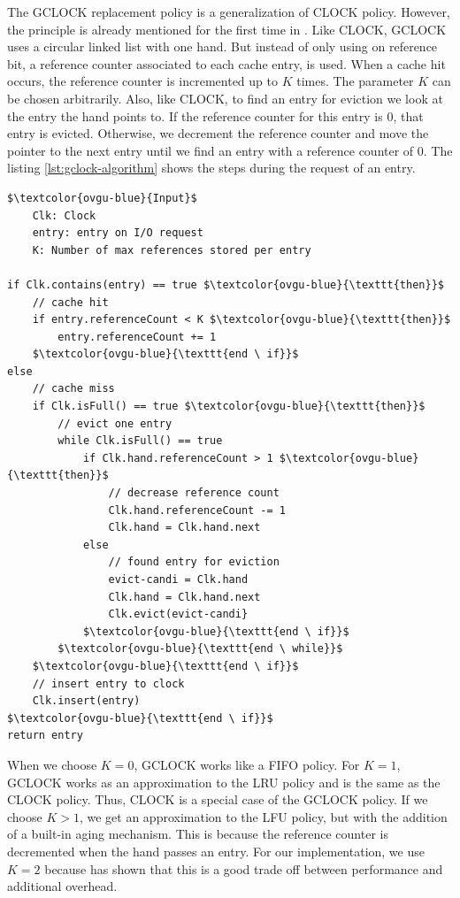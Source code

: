 \documentclass[
	12pt,
	a4paper,
	abstract,
	bibliography=totoc,
	chapterprefix,
	headings=openright,
	numbers=endperiod,
	parskip=half,
	twoside,
]{scrreprt}
\begin{document}
The GCLOCK replacement policy \cite{smith1978sequentiality} is a generalization of CLOCK policy.
However, the principle is already mentioned for the first time in \cite{corbato1968paging}.
Like CLOCK, GCLOCK uses a circular linked list with one hand.
But instead of only using on reference bit, a reference counter associated to each cache entry, is used.
When a cache hit occurs, the reference counter is incremented up to $K$ times.
The parameter $K$ can be chosen arbitrarily.
Also, like CLOCK, to find an entry for eviction we look at the entry the hand points to.
If the reference counter for this entry is 0, that entry is evicted.
Otherwise, we decrement the reference counter and move the pointer to the next entry 
until we find an entry with a reference counter of 0.
The listing \ref{lst:gclock-algorithm} shows the steps during the request of an entry.

\bigskip

\begin{lstlisting}[mathescape=true,caption=GCLOCK replacement algorithm in pseudocode,label=lst:gclock-algorithm]
$\textcolor{ovgu-blue}{Input}$
	Clk: Clock
	entry: entry on I/O request
	K: Number of max references stored per entry

if Clk.contains(entry) == true $\textcolor{ovgu-blue}{\texttt{then}}$
	// cache hit
	if entry.referenceCount < K $\textcolor{ovgu-blue}{\texttt{then}}$
		entry.referenceCount += 1
	$\textcolor{ovgu-blue}{\texttt{end \ if}}$
else
	// cache miss
	if Clk.isFull() == true $\textcolor{ovgu-blue}{\texttt{then}}$
		// evict one entry
		while Clk.isFull() == true
			if Clk.hand.referenceCount > 1 $\textcolor{ovgu-blue}{\texttt{then}}$
				// decrease reference count 
				Clk.hand.referenceCount -= 1
				Clk.hand = Clk.hand.next
			else
				// found entry for eviction 
				evict-candi = Clk.hand
				Clk.hand = Clk.hand.next
				Clk.evict(evict-candi}
			$\textcolor{ovgu-blue}{\texttt{end \ if}}$
		$\textcolor{ovgu-blue}{\texttt{end \ while}}$
	$\textcolor{ovgu-blue}{\texttt{end \ if}}$
	// insert entry to clock
	Clk.insert(entry)
$\textcolor{ovgu-blue}{\texttt{end \ if}}$
return entry 
\end{lstlisting}

When we choose $K = 0$, GCLOCK works like a FIFO policy.
For $K = 1$, GCLOCK works as an approximation to the LRU policy and is the same as the CLOCK policy.
Thus, CLOCK is a special case of the GCLOCK policy.
If we choose $K > 1$, we get an approximation to the LFU policy, but with the addition of a built-in aging mechanism.
This is because the reference counter is decremented when the hand passes an entry.
For our implementation, we use $K = 2$ because \cite{corbato1968paging} has shown that this is a good trade off between performance and additional overhead.
\end{document}
